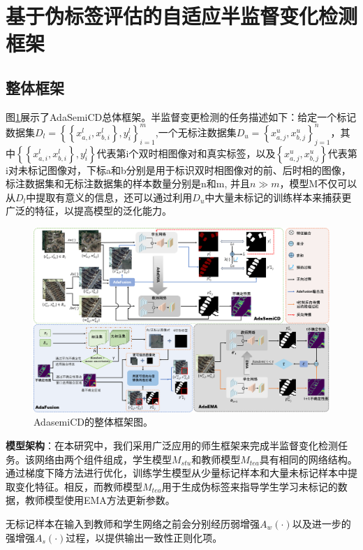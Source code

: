 \documentclass[lang=chs, degree=master, blindreview=false, adobe=false]{yanputhesis}
\begin{document}
\section{基于伪标签评估的自适应半监督变化检测框架}
\subsection{整体框架}
图\ref{fig:Adasemicd_fram}展示了AdaSemiCD总体框架。半监督变更检测的任务描述如下：给定一个标记数据集$D_{l}=\left\{\left\{x_{a, i}^{l}, x_{b, i}^{l}\right\}, y_{i}^{l}\right\}_{i=1}^{m}$,一个无标注数据集$D_{u}=\left\{x_{a, j}^{u}, x_{b, j}^{u}\right\}_{j=1}^{n}$，其中$\left\{\left\{x_{a, i}^{l}, x_{b, i}^{l}\right\}, y_{i}^{l}\right\}$代表第i个双时相图像对和真实标签，以及$\left\{x_{a, j}^{u}, x_{b, j}^{u}\right\}$代表第i对未标记图像对，下标a和b分别是用于标识双时相图像对的前、后时相的图像，标注数据集和无标注数据集的样本数量分别是n和m, 并且$n \gg m$，模型M不仅可以从$D_{l}$中提取有意义的信息，还可以通过利用$D_{u}$中大量未标记的训练样本来捕获更广泛的特征，以提高模型的泛化能力。

\begin{figure}[htb]
  \centering
  \includegraphics[scale=0.35]{images/AdaFrame.png}
  \caption{
    AdasemiCD的整体框架图。
  }
  \label{fig:Adasemicd_fram}
\end{figure}

\textbf{模型架构}：在本研究中，我们采用广泛应用的师生框架来完成半监督变化检测任务。该网络由两个组件组成，学生模型$M_{stu}$和教师模型$M_{tea}$具有相同的网络结构。通过梯度下降方法进行优化，训练学生模型从少量标记样本和大量未标记样本中提取变化特征。相反，而教师模型$M_{tea}$用于生成伪标签来指导学生学习未标记的数据，教师模型使用EMA方法更新参数。

无标记样本在输入到教师和学生网络之前会分别经历弱增强$A_{w}(\cdot)$以及进一步的强增强$A_{s}(\cdot)$过程，以提供输出一致性正则化项。
\end{document}

